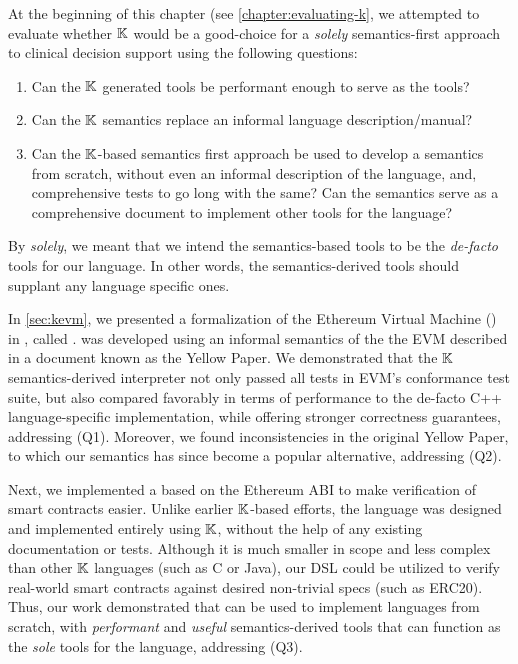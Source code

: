 At the beginning of this chapter (see \autoref{chapter:evaluating-k},
we attempted to evaluate whether $\mathbb{K}$ would be a good-choice for
a \emph{solely} semantics-first approach to clinical decision support using the following
questions:
\begin{enumerate}[label=(Q\arabic*)]
 \item Can the $\mathbb{K}$ generated tools be performant enough to serve as
 the  tools?
 \item Can the $\mathbb{K}$ semantics replace an informal language description/manual?
 \item Can the $\mathbb{K}$-based semantics first approach be used to develop
 a semantics from scratch, without even an informal description of the language,
  and, comprehensive tests to go long with the same? Can the semantics
  serve as a comprehensive document to implement other tools for the language?
\end{enumerate}
By \emph{solely}, we meant that we intend the semantics-based tools to be
the \emph{de-facto} tools for our language. In other words, the
semantics-derived tools should supplant any language specific ones.

In \autoref{sec:kevm}, we presented a formalization of the
Ethereum Virtual Machine (\EVM{}) in \K{}, called \KEVM{}.
\KEVM{} was developed using an informal semantics of the
the EVM described in a document known as the Yellow Paper.
We demonstrated that the $\mathbb{K}{}$ semantics-derived
interpreter not only passed all tests in EVM's conformance test suite,
but also compared favorably in terms of performance to the de-facto
C++ language-specific implementation, while offering stronger correctness
guarantees, addressing (Q1). Moreover, we found inconsistencies
in the original Yellow Paper, to which our semantics has since become a popular
alternative, addressing (Q2).

Next, we implemented a \DSL{} based on the Ethereum ABI to make verification of
smart contracts easier. Unlike earlier $\mathbb{K}$-based efforts, the language was
designed and implemented entirely using $\mathbb{K}$, without the help of any
existing documentation or tests. Although it is much smaller in scope and
less complex than other $\mathbb{K}$ languages (such as C or Java), our DSL could be
utilized to verify real-world smart contracts against desired non-trivial specs
(such as ERC20). Thus, our work demonstrated that \K{} can be used to implement
languages from scratch, with \emph{performant} and \emph{useful}
semantics-derived tools that can function as the \emph{sole} tools for the
language, addressing (Q3).

